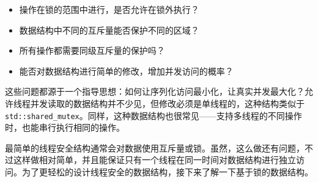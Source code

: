 \begin{itemize}
    \item 操作在锁的范围中进行，是否允许在锁外执行？
    \item 数据结构中不同的互斥量能否保护不同的区域？
    \item 所有操作都需要同级互斥量的保护吗？
    \item 能否对数据结构进行简单的修改，增加并发访问的概率？
\end{itemize}

这些问题都源于一个指导思想：如何让序列化访问最小化，让真实并发最大化？允许线程并发读取的数据结构并不少见，但修改必须是单线程的，这种结构类似于\texttt{std::shared\_mutex}。同样，这种数据结构也很常见——支持多线程的不同操作时，也能串行执行相同的操作。

最简单的线程安全结构通常会对数据使用互斥量或锁。虽然，这么做还有问题，不过这样做相对简单，并且能保证只有一个线程在同一时间对数据结构进行独立访问。为了更轻松的设计线程安全的数据结构，接下来了解一下基于锁的数据结构。

